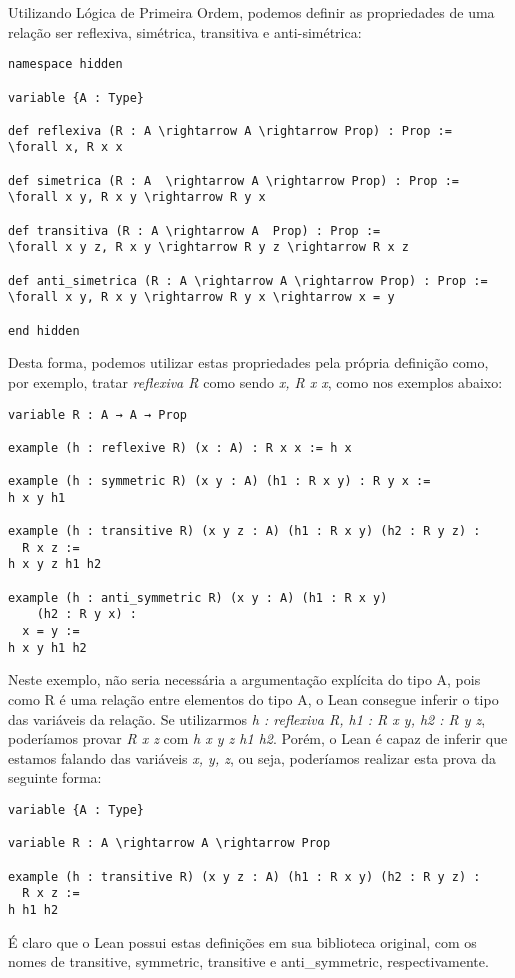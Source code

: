Utilizando Lógica de Primeira Ordem, podemos definir as propriedades de uma relação ser reflexiva, simétrica, transitiva e anti-simétrica:
\begin{lstlisting}
namespace hidden

variable {A : Type}

def reflexiva (R : A \rightarrow A \rightarrow Prop) : Prop :=
\forall x, R x x

def simetrica (R : A  \rightarrow A \rightarrow Prop) : Prop :=
\forall x y, R x y \rightarrow R y x

def transitiva (R : A \rightarrow A  Prop) : Prop :=
\forall x y z, R x y \rightarrow R y z \rightarrow R x z

def anti_simetrica (R : A \rightarrow A \rightarrow Prop) : Prop :=
\forall x y, R x y \rightarrow R y x \rightarrow x = y

end hidden
\end{lstlisting}
Desta forma, podemos utilizar estas propriedades pela própria definição como, por exemplo, tratar \textit{reflexiva R} como sendo \textit{\forall x, R x x}, como nos exemplos abaixo:
\begin{lstlisting}
variable R : A → A → Prop

example (h : reflexive R) (x : A) : R x x := h x

example (h : symmetric R) (x y : A) (h1 : R x y) : R y x :=
h x y h1

example (h : transitive R) (x y z : A) (h1 : R x y) (h2 : R y z) :
  R x z :=
h x y z h1 h2

example (h : anti_symmetric R) (x y : A) (h1 : R x y)
    (h2 : R y x) :
  x = y :=
h x y h1 h2
\end{lstlisting}
Neste exemplo, não seria necessária a argumentação explícita do tipo A, pois como R é uma relação entre elementos do tipo A, o Lean consegue inferir o tipo das variáveis da relação.
Se utilizarmos \textit{h : reflexiva R, h1 : R x y, h2 : R y z}, poderíamos provar \textit{R x z} com \textit{h x y z h1 h2}.
Porém, o Lean é capaz de inferir que estamos falando das variáveis \textit{x, y, z}, ou seja, poderíamos realizar esta prova da seguinte forma:
\begin{lstlisting}
variable {A : Type}

variable R : A \rightarrow A \rightarrow Prop

example (h : transitive R) (x y z : A) (h1 : R x y) (h2 : R y z) :
  R x z :=
h h1 h2
\end{lstlisting}
É claro que o Lean possui estas definições em sua biblioteca original, com os nomes de transitive, symmetric, transitive e anti\_symmetric, respectivamente.
